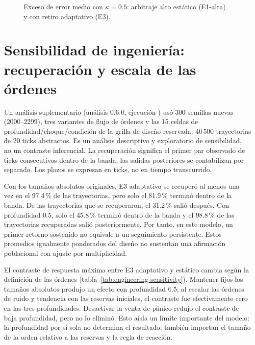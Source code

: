 \begin{figure}[htbp]
\centering
{}
\caption{Exceso de error medio con $\kappa=0.5$: arbitraje alto estático (E1-alta) y con retiro adaptativo (E3).}
\label{fig:prof}
\end{figure}

\section{Sensibilidad de ingeniería: recuperación y escala de las órdenes}
\label{sec:engineering-sensitivity}

Un análisis suplementario (análisis 0.6.0, ejecución \code{\EngineeringRunID}) usó 300 semillas nuevas (2000--2299), tres variantes de flujo de órdenes y las 15 celdas de profundidad/choque/condición de la grilla de diseño reservada: 40\,500 trayectorias de 20 ticks abstractos. Es un análisis descriptivo y exploratorio de sensibilidad, no un contraste inferencial. La recuperación significa el primer par observado de ticks consecutivos dentro de la banda; las salidas posteriores se contabilizan por separado. Los plazos se expresan en ticks, no en tiempo transcurrido.

Con los tamaños absolutos originales, E3 adaptativo se recuperó al menos una vez en el 97.4\,\% de las trayectorias, pero solo el 81.9\,\% terminó dentro de la banda. De las trayectorias que se recuperaron, el 31.2\,\% salió después. Con profundidad 0.5, solo el 45.8\,\% terminó dentro de la banda y el 98.8\,\% de las trayectorias recuperadas salió posteriormente. Por tanto, en este modelo, un primer retorno sostenido no equivale a un seguimiento persistente. Estos promedios igualmente ponderados del diseño no sustentan una afirmación poblacional con ajuste por multiplicidad.

El contraste de respuesta máxima entre E3 adaptativo y estático cambia según la definición de las órdenes (tabla~\ref{tab:engineering-sensitivity}). Mantener fijos los tamaños absolutos produjo un efecto con profundidad 0.5; al escalar las órdenes de ruido y tendencia con las reservas iniciales, el contraste fue efectivamente cero en las tres profundidades. Desactivar la venta de pánico redujo el contraste de baja profundidad, pero no lo eliminó. Esto aísla un límite importante del modelo: la profundidad por sí sola no determina el resultado; también importan el tamaño de la orden relativo a las reservas y la regla de reacción.

